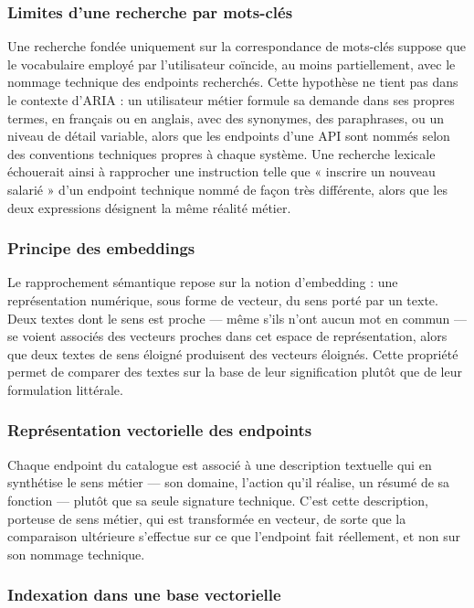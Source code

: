 \subsubsection{Limites d'une recherche par mots-clés}

Une recherche fondée uniquement sur la correspondance de mots-clés suppose que le vocabulaire employé par l'utilisateur coïncide, au moins partiellement, avec le nommage technique des endpoints recherchés. Cette hypothèse ne tient pas dans le contexte d'ARIA : un utilisateur métier formule sa demande dans ses propres termes, en français ou en anglais, avec des synonymes, des paraphrases, ou un niveau de détail variable, alors que les endpoints d'une API sont nommés selon des conventions techniques propres à chaque système. Une recherche lexicale échouerait ainsi à rapprocher une instruction telle que « inscrire un nouveau salarié » d'un endpoint technique nommé de façon très différente, alors que les deux expressions désignent la même réalité métier.

\subsubsection{Principe des embeddings}

Le rapprochement sémantique repose sur la notion d'embedding : une représentation numérique, sous forme de vecteur, du sens porté par un texte. Deux textes dont le sens est proche — même s'ils n'ont aucun mot en commun — se voient associés des vecteurs proches dans cet espace de représentation, alors que deux textes de sens éloigné produisent des vecteurs éloignés. Cette propriété permet de comparer des textes sur la base de leur signification plutôt que de leur formulation littérale.

\subsubsection{Représentation vectorielle des endpoints}

Chaque endpoint du catalogue est associé à une description textuelle qui en synthétise le sens métier — son domaine, l'action qu'il réalise, un résumé de sa fonction — plutôt que sa seule signature technique. C'est cette description, porteuse de sens métier, qui est transformée en vecteur, de sorte que la comparaison ultérieure s'effectue sur ce que l'endpoint fait réellement, et non sur son nommage technique.

\subsubsection{Indexation dans une base vectorielle}

